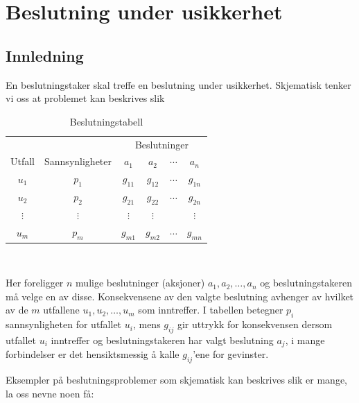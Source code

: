 \chapter{Beslutning under usikkerhet}
\label{kap:beslutning} %

\section{Innledning}

En beslutningstaker skal treffe en beslutning under usikkerhet.
Skjematisk tenker vi oss at problemet kan beskrives slik

\begin{table}[h] \centering
\begin{tabular}{c|c|cccc}
      &               & \multicolumn{4}{c}{Beslutninger} \\
Utfall&Sannsynligheter& $a_1$&$a_2$&$\cdots$&$a_n$ \\ \hline
 $u_1$ & $p_1$ & $g_{11}$ & $g_{12}$ & $\cdots$ & $g_{1n}$ \\
 $u_2$ & $p_2$ & $g_{21}$ & $g_{22}$ & $\cdots$ & $g_{2n}$ \\
 $\vdots$& $\vdots$& $\vdots$& $\vdots$&   & $\vdots$ \\
 $u_m$ & $p_m$ & $g_{m1}$ & $g_{m2}$ & $\cdots$ & $g_{mn}$ \\ \hline
\end{tabular}\\[1mm]
\caption{Beslutningstabell}
\label{tab:beslutningstabell} %
\end{table}
Her foreligger $n$ mulige beslutninger (aksjoner) $a_1, a_2, \ldots, a_n$
og beslutningstakeren må velge en av disse.  Konsekvensene av
den valgte beslutning avhenger av hvilket av de $m$ utfallene
$u_1, u_2, \ldots, u_m$ som inntreffer.  I tabellen betegner $p_i$
sannsynligheten for utfallet $u_i$, mens $g_{ij}$ gir uttrykk for
konsekvensen dersom utfallet $u_i$ inntreffer og beslutningstakeren har
valgt beslutning $a_j$, i mange forbindelser er det hensiktsmessig å
kalle $g_{ij}$'ene for gevinster.

Eksempler på beslutningsproblemer som skjematisk kan beskrives slik
er mange, la oss nevne noen få:

